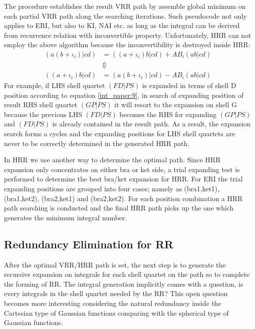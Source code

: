 The procedure establishes the result VRR path by assemble global minimum on each partial VRR
path along the searching iterations. Such pseudocode not only applies to ERI, but also to
KI, NAI etc. as long as the integral can be derived from recurrence relation with inconvertible
property. Unfortunately, HRR can not employ the above algorithm because the inconvertibility 
is destroyed inside HRR:
\begin{align}
\label{int_paper:9}
 (a(b+\iota_{i})|cd) &= ((a+\iota_{i})b|cd) + AB_{i}(ab|cd)   \nonumber \\
                     &\Updownarrow                            \nonumber \\
 ((a+\iota_{i})b|cd) &= (a(b+\iota_{i})|cd) - AB_{i}(ab|cd)   
\end{align}
For example, if LHS shell quartet $(FD|PS)$ is expanded in terms of shell D position according 
to equation \ref{int_paper:9}, in search of expanding position of result RHS shell quartet $(GP|PS)$
it will resort to the expansion on shell G because the previous LHS $(FD|PS)$ becomes the RHS for
expanding $(GP|PS)$ and $(FD|PS)$ is already contained in the result path. As a result, the expansion 
search forms a cycles and the expanding positions for LHS shell quartets are never to be correctly 
determined in the generated HRR path.

In HRR we use another way to determine the optimal path. Since HRR expansion only concentrates on
either bra or ket side, a trial expanding test is performed to determine the best bra/ket 
expansion for HRR. For ERI the trial expanding positions are grouped into four cases; namely 
as (bra1,ket1), (bra1,ket2), (bra2,ket1) and (bra2,ket2). For each position combination a HRR 
path searching is conducted and the final HRR path picks up the one which generates the minimum
integral number.

\subsection{Redundancy Elimination for RR}
\label{redundancy_rr}

After the optimal VRR/HRR path is set, the next step is to generate 
the recursive expansion on integrals for each shell quartet on the 
path so to complete the forming of RR. The integral
generation implicitly comes with a question, is every integrals in 
the shell quartet needed by the RR? This open question becomes more 
interesting considering the natural redundancy inside the Cartesian 
type of Gaussian functions comparing with the spherical type of Gaussian
functions.

